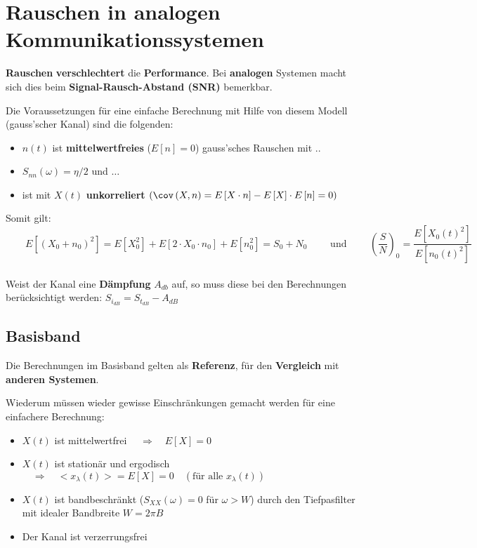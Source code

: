\section{Rauschen in analogen Kommunikationssystemen }
\textbf{Rauschen} \textbf{verschlechtert} die \textbf{Performance}. Bei \textbf{analogen} Systemen
macht sich dies beim \textbf{Signal-Rausch-Abstand (SNR)} bemerkbar.
\begin{figure}[!ht]
\begin{center}
	
\end{center}
\end{figure}
Die Voraussetzungen für eine einfache Berechnung mit Hilfe von diesem Modell (gauss'scher Kanal)
sind die folgenden:
\begin{itemize}
  \item $n(t)$ ist \textbf{mittelwertfreies} ($E[n] = 0$) gauss'sches Rauschen mit ..
  \item $S_{nn}(\omega) = \eta/2$ und $\ldots$
  \item ist mit $X \left( t \right)$ \textbf{unkorreliert} $\left( \cov
  \left(X,n \right) = E \left[ X \cdot n \right] - E \left[ X \right] \cdot E
  \left[ n \right] = 0 \right)$
\end{itemize}
Somit gilt: $\qquad E[(X_0 + n_0)^2] = E[X_0^2] + E[2 \cdot X_0 \cdot n_0] + E[n_0^2] = S_0 + N_0
\qquad \text{ und } \qquad \left(\dfrac{S}{N}\right)_0 = \dfrac{E[X_0(t)^2]}{E[n_0(t)^2]}$ \\ \\
Weist der Kanal eine \textbf{Dämpfung} $A_{db}$ auf, so muss diese bei den Berechnungen berücksichtigt
werden: $S_{i_{dB}} = S_{t_{dB}} - A_{dB}$



\subsection{Basisband }
Die Berechnungen im Basisband gelten als \textbf{Referenz}, für den \textbf{Vergleich} mit
\textbf{anderen Systemen}. \\
\begin{figure}[!ht]
\begin{center}
	
\end{center}
\end{figure}
Wiederum müssen wieder gewisse Einschränkungen gemacht werden für eine einfachere Berechnung:
\begin{itemize}
  \item $X(t)$ ist mittelwertfrei $\quad \Rightarrow \quad E[X]=0$
  \item $X(t)$ ist stationär und ergodisch $\quad \Rightarrow \quad <x_{\lambda}(t)> = E[X] = 0
  \quad (\text{für alle } x_{\lambda}(t))$
  \item $X(t)$ ist bandbeschränkt ($S_{XX}(\omega) = 0 $ für $\omega > W$) durch den Tiefpasfilter
  mit idealer Bandbreite $W = 2 \pi B$
  \item Der Kanal ist verzerrungsfrei
\end{itemize}


